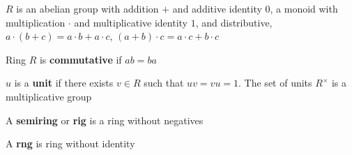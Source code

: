 \documentclass[main]{subfiles}
\begin{document}
\begin{definition} \par
$R$ is an abelian group with addition $+$ and additive identity $0$, a monoid with multiplication $\cdot$ and multiplicative identity $1$, and distributive, $a\cdot(b+c)=a\cdot b+a\cdot c$, $(a+b)\cdot c=a\cdot c+b\cdot c$
\end{definition}

\begin{definition}
Ring $R$ is \textbf{commutative} if $ab=ba$
\end{definition}

\begin{definition}
$u$ is a \textbf{unit} if there exists $v\in R$ such that $uv=vu=1$. The set of units $R^\times$ is a multiplicative group
\end{definition}

\begin{definition}
A \textbf{semiring} or \textbf{rig} is a ring without negatives
\end{definition}

\begin{definition}
A \textbf{rng} is ring without identity
\end{definition}
\end{document}
